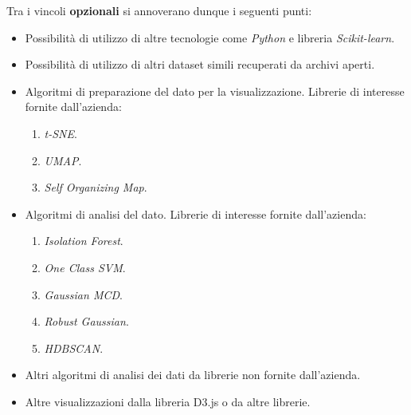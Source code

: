 \noindent Tra i vincoli \textbf{opzionali} si annoverano dunque i seguenti punti:
\begin{itemize}
\item Possibilità di utilizzo di altre tecnologie come \textit{Python} e libreria \textit{Scikit-learn}. 
\item Possibilità di utilizzo di altri dataset simili recuperati da archivi aperti.
\item Algoritmi di preparazione del dato per la visualizzazione. Librerie di interesse fornite dall'azienda:
	\begin{enumerate}
                    \item \textit{t-SNE}.
                    \item \textit{UMAP}.
                    \item \textit{Self Organizing Map}.
	\end{enumerate}
\item Algoritmi di analisi del dato. Librerie di interesse fornite dall'azienda:
	\begin{enumerate}
                    \item \textit{Isolation Forest}.
                    \item \textit{One Class SVM}.
                    \item \textit{Gaussian MCD}.
                    \item \textit{Robust Gaussian}.
                    \item \textit{HDBSCAN}.
	\end{enumerate}
\item Altri algoritmi di analisi dei dati da librerie non fornite dall’azienda.
\item Altre visualizzazioni dalla libreria D3.js o da altre librerie.
\end{itemize}



